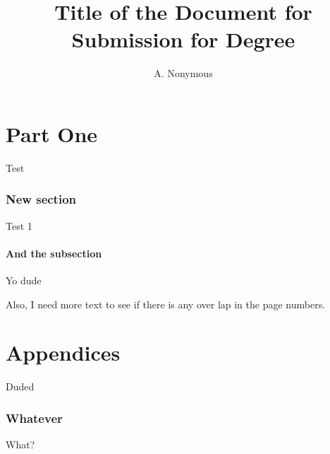 \documentclass[phd,lof,lot]{cwru}
\title{Title of the Document for Submission for Degree}
\author{A. Nonymous}
\begin{document}

\CWRUpreamble{}

\part{Part One}

Test

\section{New section}

Test 1

\subsection{And the subsection}

Yo dude


\vfill

Also, I need more text to see if there is any over lap in the page numbers.

\appendix
\part{Appendices}

Duded

\section{Whatever}

What?

\end{document}
